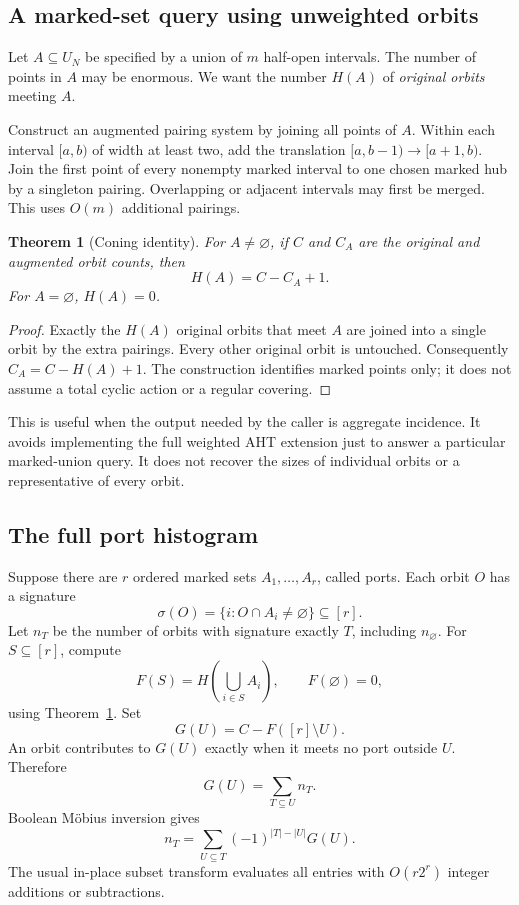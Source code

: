 \documentclass[11pt,a4paper]{article}
\newtheorem{theorem}{Theorem}[section]
\theoremstyle{definition}\newtheorem{definition}[theorem]{Definition}
\theoremstyle{remark}\newtheorem{remark}[theorem]{Remark}
\begin{document}
\subsection{A marked-set query using unweighted orbits}

Let $A\subseteq U_N$ be specified by a union of $m$ half-open intervals.
The number of points in $A$ may be enormous. We want the number $H(A)$ of
\emph{original orbits} meeting $A$.

Construct an augmented pairing system by joining all points of $A$. Within
each interval $[a,b)$ of width at least two, add the translation
$[a,b-1)\to[a+1,b)$. Join the first point of every nonempty marked interval
to one chosen marked hub by a singleton pairing. Overlapping or adjacent
intervals may first be merged. This uses $O(m)$ additional pairings.

\begin{theorem}[Coning identity]\label{thm:cone}
For $A\neq\varnothing$, if $C$ and $C_A$ are the original and augmented
orbit counts, then
\[
 H(A)=C-C_A+1.
\]
For $A=\varnothing$, $H(A)=0$.
\end{theorem}
\begin{proof}
Exactly the $H(A)$ original orbits that meet $A$ are joined into a single
orbit by the extra pairings. Every other original orbit is untouched.
Consequently $C_A=C-H(A)+1$. The construction identifies marked points
only; it does not assume a total cyclic action or a regular covering.
\end{proof}

This is useful when the output needed by the caller is aggregate incidence.
It avoids implementing the full weighted AHT extension just to answer a
particular marked-union query. It does not recover the sizes of individual
orbits or a representative of every orbit.

\subsection{The full port histogram}

Suppose there are $r$ ordered marked sets $A_1,\ldots,A_r$, called ports.
Each orbit $O$ has a signature
\[
 \sigma(O)=\{i:O\cap A_i\neq\varnothing\}\subseteq[r].
\]
Let $n_T$ be the number of orbits with signature exactly $T$, including
$n_\varnothing$. For $S\subseteq[r]$, compute
\[
 F(S)=H\!\left(\bigcup_{i\in S}A_i\right),\qquad F(\varnothing)=0,
\]
using Theorem~\ref{thm:cone}. Set
\[
 G(U)=C-F([r]\setminus U).
\]
An orbit contributes to $G(U)$ exactly when it meets no port outside $U$.
Therefore
\[
 G(U)=\sum_{T\subseteq U}n_T.
\]
Boolean M\"obius inversion gives
\begin{equation}\label{eq:mobius}
 n_T=\sum_{U\subseteq T}(-1)^{|T|-|U|}G(U).
\end{equation}
The usual in-place subset transform evaluates all entries with
$O(r2^r)$ integer additions or subtractions.
\end{document}
